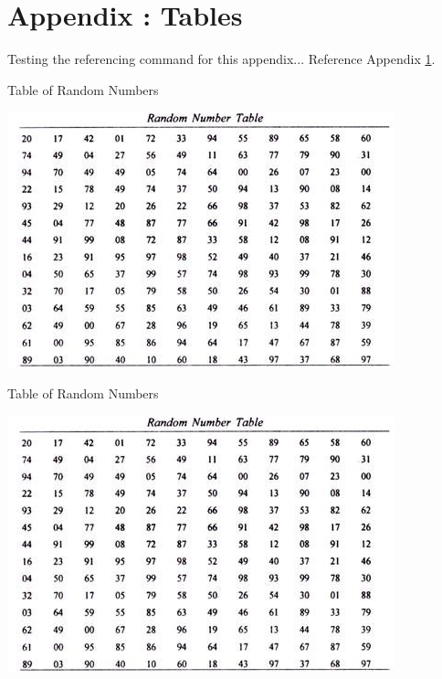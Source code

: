 \chapter{Appendix \thechapter: Tables}\label{app:Tables}

\renewcommand\numberline[1]{\hbox to 56pt{Table #1:\hspace{1ex}}} %

\vspace*{-2.5cm}
\listofatables

\pagebreak

Testing the referencing command for this appendix... Reference Appendix \ref{app:Tables}.

\begin{atable}[htb]
    \caption{Table of Random Numbers}
    \label{tab:my_label4}
    \centering
    \includegraphics{tables/table.png}
\end{atable}

\newpage

\begin{atable}[htb]
    \caption{Table of Random Numbers}
    \label{tab:my_label5}    
    \centering
    \includegraphics{tables/table.png}
\end{atable}


\pagebreak

% 
